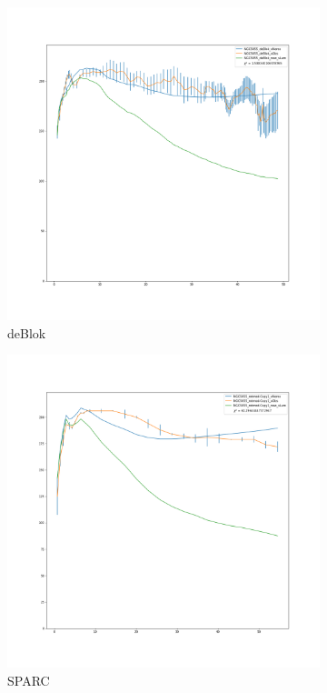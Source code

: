 \documentclass[reprint,%
 amsmath,amssymb,
 aps,
]{revtex4-1}
\begin{document}
 \begin{figure}[h]
\begin{subfigure}{.5\textwidth}
  \centering
  \includegraphics[width=.8\linewidth]{NGC5055_deBlok_XueSofue}
  \caption{deBlok\cite{Blok1}}
  \label{fig:sfig1}
\end{subfigure}%
\begin{subfigure}{.5\textwidth}
  \centering
  \includegraphics[width=.8\linewidth]{NGC5055_rotmod-Copy1_XueSofue}
  \caption{SPARC\cite{2016Lelli}}
  \label{fig:sfig2}
\end{subfigure}
\begin{subfigure}{.5\textwidth}

\end{subfigure}
\end{figure}
\end{document}
